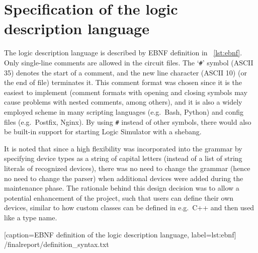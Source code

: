 \section{Specification of the logic description language}
  The logic description language is described by EBNF definition in
  \lstlistingname~\ref{lst:ebnf}. Only single-line comments are allowed
  in the circuit files. The `\texttt{\#}' symbol (ASCII 35) denotes the
  start of a comment, and the new line character (ASCII 10) (or the end of
  file) terminates it. This comment format was chosen since it is
  the easiest to implement (comment formats with opening and closing
  symbols may cause problems with nested comments, among others), and
  it is also a widely employed scheme in many scripting languages
  (e.g.~Bash, Python) and config files (e.g.~Postfix, Nginx).
  By using \texttt{\#} instead of other symbols, there would also
  be built-in support for starting Logic Simulator with a
  shebang.

  It is noted that since a high flexibility was incorporated into the
  grammar by specifying device types as a string of capital letters
  (instead of a list of string literals of
  recognized devices), there was no need to change the grammar
  (hence no need to change the parser) when additional devices were
  added during the maintenance phase. The rationale behind this
  design decision was to allow a potential enhancement of the
  project, such that users can define their own devices, similar
  to how custom classes can be defined in e.g.~C++ and then used
  like a type name.

  
      [caption={EBNF definition of the logic description language},
       label={lst:ebnf}]
      {\gitrepopath/finalreport/definition_syntax.txt}
